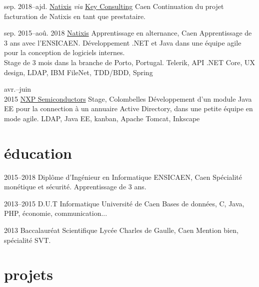 \documentclass[]{friggeri-cv}
\begin{document}
\begin{entrylist}
	\entry
	{sep. 2018--ajd.}
	{\href{https://www.natixis.com}{Natixis} \normalfont \emph{via} \href{https://www.keyconsulting.fr}{Key Consulting}}
	{Caen}
	{Continuation du projet facturation de Natixis en tant que prestataire.}{}
	
	\entry
	{sep. 2015--aoû. 2018}
	{\href{https://www.natixis.com}{Natixis}}
	{Apprentissage en alternance, Caen}
	{Apprentissage de 3 ans avec l’ENSICAEN. Développement \csharp .NET et Java dans une équipe agile pour la conception de logiciels internes.\\Stage de 3 mois dans la branche de Porto, Portugal.}
	{Telerik, API .NET Core, UX design, LDAP, IBM FileNet, TDD/BDD, Spring}
	
	\entry
	{avr.--juin\\2015}
	{\href{https://www.nxp.com}{NXP Semiconductors}}
	{Stage, Colombelles}
	{Développement d’un module Java EE pour la connection à un annuaire Active Directory, dans une petite équipe en mode agile.}
	{LDAP, Java EE, kanban, Apache Tomcat, Inkscape}
\end{entrylist}

\section{éducation}

\begin{entrylist}
    \entry
    {2015--2018}
    {Diplôme d’Ingénieur {\normalfont en Informatique}}
    {ENSICAEN, Caen}
    {Spécialité monétique et sécurité. Apprentissage de 3 ans.}{}
    
    \entry
    {2013--2015}
    {D.U.T {\normalfont Informatique}}
    {Université de Caen}
    {Bases de données, C, Java, PHP, économie, communication...}{}
    
    \entry
    {2013}
    {Baccalauréat {\normalfont Scientifique}}
    {Lycée Charles de Gaulle, Caen}
    {Mention bien, spécialité SVT.}{}
\end{entrylist}

\section{projets}
\end{document}
